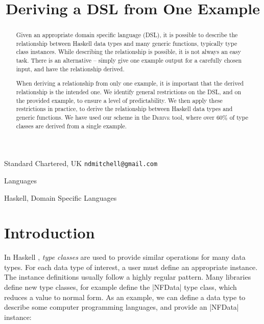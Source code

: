 \documentclass[preprint,draft]{sigplanconf}
\newcommand{\derive}{\textsc{Derive}}
\begin{document}
\copyrightdata{[to be supplied]}

\titlebanner{\today{} - \currenttime{}}        %
\preprintfooter{}   %

\title{Deriving a DSL from One Example}

           {Standard Chartered, UK}
           {\verb"ndmitchell@gmail.com"}

\maketitle


\begin{abstract}
Given an appropriate domain specific language (DSL), it is possible to describe the relationship between Haskell data types and many generic functions, typically type class instances. While describing the relationship is possible, it is not always an easy task. There is an alternative -- simply give one example output for a carefully chosen input, and have the relationship derived.

When deriving a relationship from only one example, it is important that the derived relationship is the intended one. We identify general restrictions on the DSL, and on the provided example, to ensure a level of predictability. We then apply these restrictions in practice, to derive the relationship between Haskell data types and generic functions. We have used our scheme in the \derive{} tool, where over 60\% of type classes are derived from a single example.
\end{abstract}


\terms
Languages

\keywords
Haskell, Domain Specific Languages

\section{Introduction}
\label{sec:introduction}

In Haskell \cite{haskell}, \textit{type classes} \cite{wadler:type_classes} are used to provide similar operations for many data types. For each data type of interest, a user must define an appropriate instance. The instance definitions usually follow a highly regular pattern. Many libraries define new type classes, for example \citet{trinder:strategies} define the |NFData| type class, which reduces a value to normal form. As an example, we can define a data type to describe some computer programming languages, and provide an |NFData| instance:
\end{document}
